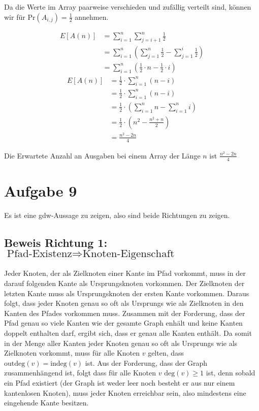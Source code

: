 \documentclass[parskip=half,a4paper]{scrartcl}
\begin{document}
Da die Werte im Array paarweise verschieden und zufällig verteilt sind, können wir für $\text{Pr}(A_{i,j}) = \frac{1}{2}$ annehmen.


\begin{equation}
\begin{aligned}
   E\left[A(n)\right] &= \sum_{i=1}^{n}{\sum_{j=i+1}^{n}{\frac{1}{2}}}\\
   &= \sum_{i=1}^{n}{\left(\sum_{j=1}^{n}{\frac{1}{2}} - \sum_{j=1}^{i}{\frac{1}{2}}\right)}\\
   &= \sum_{i=1}^{n}{\left(\frac{1}{2}\cdot n - \frac{1}{2}\cdot i\right)}
\end{aligned}
\end{equation}
\begin{equation}
\begin{aligned}
   E\left[A(n)\right] &= \frac{1}{2} \cdot \sum_{i=1}^{n}{\left(n - i\right)}\\
   &= \frac{1}{2} \cdot \sum_{i=1}^{n}{\left(n - i\right)}\\
   &= \frac{1}{2} \cdot \left(\sum_{i=1}^{n}{n} - \sum_{i=1}^{n}{i}\right)\\
   &= \frac{1}{2} \cdot \left(n^2 - \frac{n^2 + n}{2}\right)\\
   &= \frac{n^2 - 2n}{4}
\end{aligned}
\end{equation}

Die Erwartete Anzahl an Ausgaben bei einem Array der Länge $n$ ist $\frac{n^2 - 2n}{4}$

\section*{Aufgabe 9}

Es ist eine gdw-Aussage zu zeigen, also sind beide Richtungen zu zeigen.

\subsection*{Beweis Richtung 1: $\text{Pfad-Existenz} \Rightarrow \text{Knoten-Eigenschaft}$}

Jeder Knoten, der als Zielknoten einer Kante im Pfad vorkommt, muss in der darauf folgenden Kante als Ursprungsknoten vorkommen. Der Zielknoten der letzten Kante muss als Ursprungsknoten der ersten Kante vorkommen. Daraus folgt, dass jeder Knoten genau so oft als Ursprungs wie als Zielknoten in den Kanten des Pfades vorkommen muss. Zusammen mit der Forderung, dass der Pfad genau so viele Kanten wie der gesamte Graph enhält und keine Kanten doppelt enthalten darf, ergibt sich, dass er genau alle Kanten enthält. Da somit in der Menge aller Kanten jeder Knoten genau so oft als Ursprungs wie als Zielknoten vorkommt, muss für alle Knoten $v$ gelten, dass $\text{outdeg}(v) = \text{indeg}(v)$ ist. Aus der Forderung, dass der Graph zusammenhängend ist, folgt dass für alle Knoten $v$ $\text{deg}(v) \ge 1$ ist, denn sobald ein Pfad existiert (der Graph ist weder leer noch besteht er aus nur einem kantenlosen Knoten), muss jeder Knoten erreichbar sein, also mindestens eine eingehende Kante besitzen.
\end{document}
